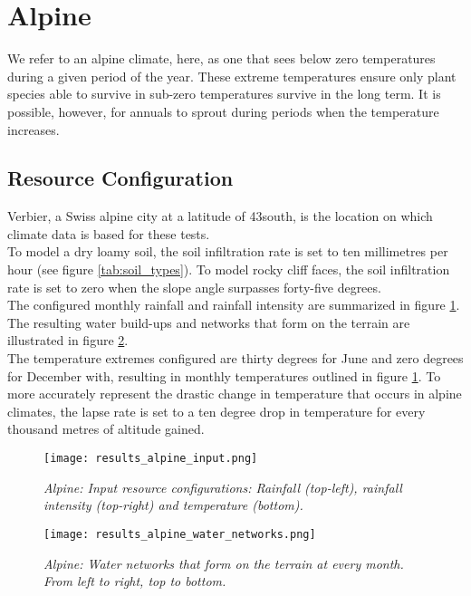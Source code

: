 \section{Alpine}

We refer to an alpine climate, here, as one that sees below zero temperatures during a given period of the year. These extreme temperatures ensure only plant species able to survive in sub-zero temperatures survive in the long term. It is possible, however, for annuals to sprout during periods when the temperature increases.\\

\subsection{Resource Configuration}

Verbier, a Swiss alpine city at a latitude of 43\textdegree south, is the location on which climate data is
based for these tests.\\

To model a dry loamy soil, the soil infiltration rate is set to ten millimetres per hour (see figure \ref{tab:soil_types}). To
model rocky cliff faces, the soil infiltration rate is set to zero when the slope angle surpasses forty-five degrees.\\

The configured monthly rainfall and rainfall intensity are summarized in figure \ref{fig:results_alpine_input}. The resulting water build-ups and networks that form on the terrain are illustrated in figure \ref{fig:results_alpine_water_networks}.\\

The temperature extremes configured are thirty degrees for June and zero degrees for December with, resulting in monthly temperatures outlined in figure \ref{fig:results_alpine_input}. To more accurately represent the drastic change in temperature that occurs in alpine climates, the lapse rate is set to a ten degree drop in temperature for every thousand metres of altitude gained.\\

\begin{figure}
\center
	\texttt{[image: results\_alpine\_input.png]}
	\caption{ \textit{Alpine: Input resource configurations: Rainfall (top-left), rainfall intensity (top-right) and temperature (bottom).}}
	\label{fig:results_alpine_input}
\end{figure}

\begin{figure}
\center
	\texttt{[image: results\_alpine\_water\_networks.png]}
	\caption{\textit{Alpine: Water networks that form on the terrain at every month. From left to right, top to bottom.}}
	\label{fig:results_alpine_water_networks}
\end{figure}

